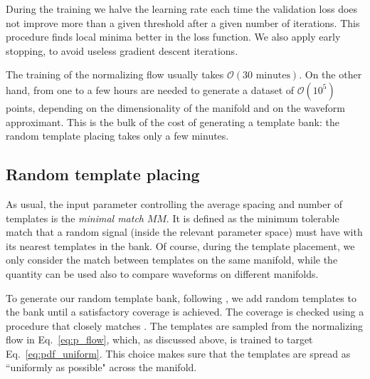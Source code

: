 \documentclass[twocolumn,showpacs,preprintnumbers,nofootinbib,prd,
superscriptaddress,10pt]{revtex4-2}
\begin{document}
During the training we halve the learning rate each time the validation loss does not improve more than a given threshold after a given number of iterations. This procedure finds local minima better in the loss function. We also apply early stopping, to avoid useless gradient descent iterations.

The training of the normalizing flow usually takes $\mathcal{O}(30 \text{ minutes})$. On the other hand, from one to a few hours are needed to generate a dataset of $\mathcal{O}(10^5)$ points, depending on the dimensionality of the manifold and on the waveform approximant.
This is the bulk of the cost of generating a template bank: the random template placing takes only a few minutes.

\subsection{Random template placing} \label{sec:template_placing}

As usual, the input parameter controlling the average spacing and number of templates is the {\it minimal match} $MM$. It is defined as the minimum tolerable match that a random signal (inside the relevant parameter space) must have with its nearest templates in the bank.
Of course, during the template placement, we only consider the match between templates on the same manifold, while the quantity can be used also to compare waveforms on different manifolds.

To generate our random template bank, following \cite{Messenger:2008ta}, we add random templates to the bank until a satisfactory coverage is achieved. The coverage is checked using a procedure that closely matches \cite{Coogan:2022qxs}.
The templates are sampled from the normalizing flow in Eq.~\eqref{eq:p_flow}, which, as discussed above, is trained to target Eq.~\eqref{eq:pdf_uniform}. This choice makes sure that the templates are spread as ``uniformly as possible" across the manifold.
\end{document}
